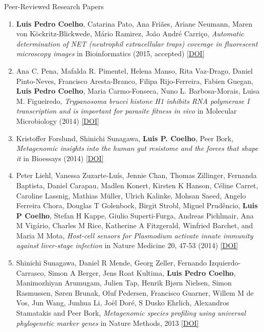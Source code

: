\documentclass{article}
\renewcommand\subsection[1]{%
    \par\vspace{.1em}%
    {\hspace{1em}\subsubhead #1}%
    \par\vspace{.2em}%
}
\newcommand\showdoi[1]{%
    \href{http://dx.doi.org/#1}{[DOI]}%
}
\begin{document}
\subsection{Peer-Reviewed Research Papers}
\begin{enumerate}

\item \textbf{Luis Pedro Coelho}, Catarina Pato, Ana Friães, Ariane Neumann,
Maren von Köckritz-Blickwede, Mário Ramirez, João André Carriço,
\emph{Automatic determination of NET (neutrophil extracellular traps) coverage
in fluorescent microscopy images} in Bioinformatics (2015, accepted)
\showdoi{10.1093/bioinformatics/btv156}

\item Ana C. Pena, Mafalda R. Pimentel, Helena Manso, Rita Vaz-Drago, Daniel
Pinto-Neves, Francisco Aresta-Branco, Filipa Rijo-Ferreira, Fabien Guegan,
\textbf{Luis Pedro Coelho}, Maria Carmo-Fonseca, Nuno L. Barbosa-Morais, Luisa
M. Figueiredo, \emph{Trypanosoma brucei histone H1 inhibits RNA polymerase I
transcription and is important for parasite fitness in vivo} in Molecular
Microbiology (2014) \showdoi{10.1111/mmi.12677}

\item Kristoffer Forslund, Shinichi Sunagawa, \textbf{Luis P. Coelho}, Peer
Bork, \emph{Metagenomic insights into the human gut resistome and the forces that
shape it} in Bioessays (2014) \showdoi{10.1002/bies.201300143}

\item  Peter Liehl,  Vanessa Zuzarte-Luís,  Jennie Chan,  Thomas Zillinger,
Fernanda Baptista,  Daniel Carapau,  Madlen Konert, Kirsten K Hanson, Céline
Carret,  Caroline Lassnig,  Mathias Müller,  Ulrich Kalinke, Mohsan Saeed,
Angelo Ferreira Chora,  Douglas T Golenbock,  Birgit Strobl, Miguel Prudêncio,
\textbf{Luis P Coelho},  Stefan H Kappe,  Giulio Superti-Furga, Andreas
Pichlmair,  Ana M Vigário,  Charles M Rice, Katherine A Fitzgerald, Winfried
Barchet, and Maria M Mota, \emph{Host-cell sensors for Plasmodium activate
innate immunity against liver-stage infection} in Nature Medicine 20, 47-53
(2014) \showdoi{10.1038/nm.3424}

\item Shinichi Sunagawa,  Daniel R Mende,  Georg Zeller,  Fernando
Izquierdo-Carrasco,  Simon A Berger,  Jens Roat Kultima,  \textbf{Luis Pedro
Coelho}, Manimozhiyan Arumugam,  Julien Tap, Henrik Bjørn Nielsen,  Simon
Rasmussen, Søren Brunak,  Oluf Pedersen,  Francisco Guarner, Willem M de Vos,
Jun Wang,  Junhua Li,  Joël Doré,  S Dusko Ehrlich,  Alexandros Stamatakis and
Peer Bork, \emph{Metagenomic species profiling using universal phylogenetic
marker genes} in Nature Methods, 2013 \showdoi{10.1038/nmeth.2693}


\end{enumerate}
\end{document}

